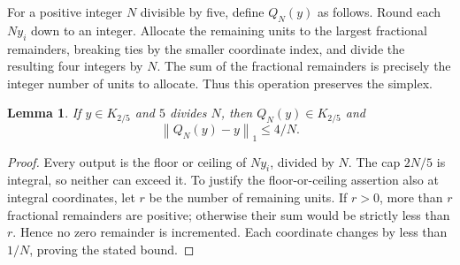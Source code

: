 \documentclass[11pt]{amsart}
\newtheorem{lemma}[theorem]{Lemma}
\theoremstyle{definition}
\newcommand{\norm}[1]{\left\lVert#1\right\rVert_1}
\begin{document}
For a positive integer $N$ divisible by five, define $Q_N(y)$ as follows. Round each $Ny_i$ down to an integer. Allocate the remaining units to the largest fractional remainders, breaking ties by the smaller coordinate index, and divide the resulting four integers by $N$. The sum of the fractional remainders is precisely the integer number of units to allocate. Thus this operation preserves the simplex.

\begin{lemma}\label{lem:round}
If $y\in K_{2/5}$ and $5$ divides $N$, then $Q_N(y)\in K_{2/5}$ and
\[
 \norm{Q_N(y)-y}\le4/N.
\]
\end{lemma}
\begin{proof}
Every output is the floor or ceiling of $Ny_i$, divided by $N$. The cap $2N/5$ is integral, so neither can exceed it. To justify the floor-or-ceiling assertion also at integral coordinates, let $r$ be the number of remaining units. If $r>0$, more than $r$ fractional remainders are positive; otherwise their sum would be strictly less than $r$. Hence no zero remainder is incremented. Each coordinate changes by less than $1/N$, proving the stated bound.
\end{proof}
\end{document}
